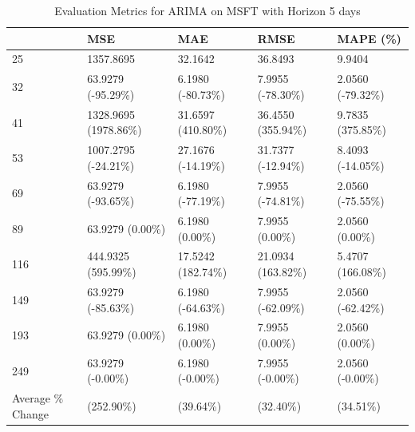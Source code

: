 \begin{table}
\caption{Evaluation Metrics for ARIMA on MSFT with Horizon 5 days}
\label{tab:arima_MSFT_h5_metrics}
\begin{tabular}{lllll}
\toprule
 & MSE & MAE & RMSE & MAPE (\%) \\
\midrule
25 & 1357.8695 & 32.1642 & 36.8493 & 9.9404 \\
32 & 63.9279 (-95.29\%) & 6.1980 (-80.73\%) & 7.9955 (-78.30\%) & 2.0560 (-79.32\%) \\
41 & 1328.9695 (1978.86\%) & 31.6597 (410.80\%) & 36.4550 (355.94\%) & 9.7835 (375.85\%) \\
53 & 1007.2795 (-24.21\%) & 27.1676 (-14.19\%) & 31.7377 (-12.94\%) & 8.4093 (-14.05\%) \\
69 & 63.9279 (-93.65\%) & 6.1980 (-77.19\%) & 7.9955 (-74.81\%) & 2.0560 (-75.55\%) \\
89 & 63.9279 (0.00\%) & 6.1980 (0.00\%) & 7.9955 (0.00\%) & 2.0560 (0.00\%) \\
116 & 444.9325 (595.99\%) & 17.5242 (182.74\%) & 21.0934 (163.82\%) & 5.4707 (166.08\%) \\
149 & 63.9279 (-85.63\%) & 6.1980 (-64.63\%) & 7.9955 (-62.09\%) & 2.0560 (-62.42\%) \\
193 & 63.9279 (0.00\%) & 6.1980 (0.00\%) & 7.9955 (0.00\%) & 2.0560 (0.00\%) \\
249 & 63.9279 (-0.00\%) & 6.1980 (-0.00\%) & 7.9955 (-0.00\%) & 2.0560 (-0.00\%) \\
Average \% Change & (252.90\%) & (39.64\%) & (32.40\%) & (34.51\%) \\
\bottomrule
\end{tabular}
\end{table}
